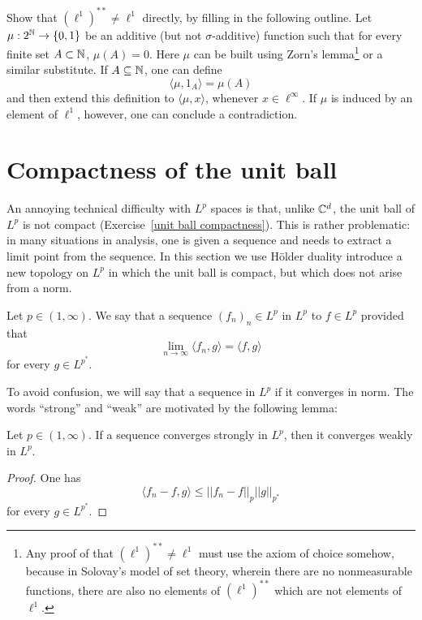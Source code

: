 \begin{exercise}
Show that $(\ell^1)^{**} \neq \ell^1$ directly, by filling in the following outline.
Let $\mu: 2^{\mathbb{N}} \to \{0, 1\}$ be an additive (but not $\sigma$-additive) function such that for every finite set $A \subset \mathbb{N}$, $\mu(A) = 0$.
Here $\mu$ can be built using Zorn's lemma\footnote{Any proof of that $(\ell^1)^{**} \neq \ell^1$ must use the axiom of choice somehow, because in Solovay's model of set theory, wherein there are no nonmeasurable functions, there are also no elements of $(\ell^1)^{**}$ which are not elements of $\ell^1$.} or a similar substitute.
If $A \subseteq \mathbb{N}$, one can define
\[\langle \mu, 1_A\rangle = \mu(A)\]
and then extend this definition to $\langle \mu, x\rangle$, whenever $x \in \ell^\infty$.
If $\mu$ is induced by an element of $\ell^1$, however, one can conclude a contradiction.
\end{exercise}

\section{Compactness of the unit ball}
An annoying technical difficulty with $L^p$ spaces is that, unlike $\mathbb{C}^d$, the unit ball of $L^p$ is not compact (Exercise~\ref{unit ball compactness}).
This is rather problematic: in many situations in analysis, one is given a sequence and needs to extract a limit point from the sequence.
In this section we use H\"older duality introduce a new topology on $L^p$ in which the unit ball is compact, but which does not arise from a norm.

\begin{definition}
Let $p \in (1, \infty)$. We say that a sequence $(f_{n})_{n} \in L^p$  in $L^p$ to $f \in L^p$ provided that
\[\lim_{n \to \infty} \langle f_{n}, g\rangle = \langle f, g\rangle\]
for every $g \in L^{p^*}$.
\end{definition}

To avoid confusion, we will say that a sequence  in $L^p$ if it converges in norm.
The words ``strong'' and ``weak'' are motivated by the following lemma:

\begin{lemma}
Let $p \in (1, \infty)$. If a sequence converges strongly in $L^p$, then it converges weakly in $L^p$.
\end{lemma}
\begin{proof}
One has
\[\langle f_{n} - f, g \rangle \leq ||f_{n} - f||_{p}  ||g||_{p^*}\]
for every $g \in L^{p^*}$.
\end{proof}

